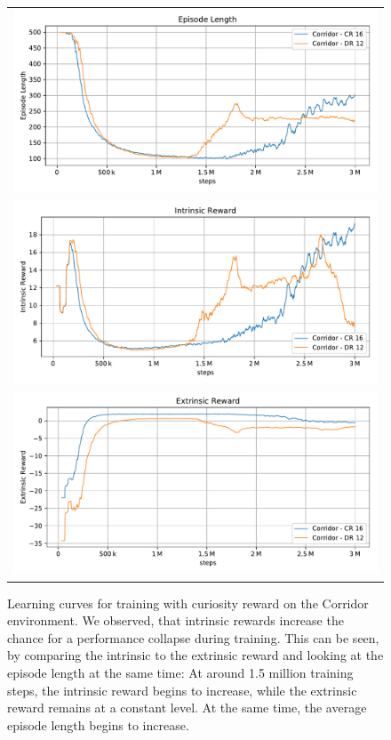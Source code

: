 \begin{figure}[htp]
    
    \begin{center}
        \begin{tabular}{c}
            \includegraphics[clip, width=0.75\columnwidth]{figures/evaluation/rewards/curiosity_divergence_ep_len.pdf} \\
            \includegraphics[clip, width=0.75\columnwidth]{figures/evaluation/rewards/curiosity_divergence_int_rew.pdf} \\
            \includegraphics[clip, width=0.75\columnwidth]{figures/evaluation/rewards/curiosity_divergence_ext_rew.pdf}
        \end{tabular}

    \end{center}
    
    \caption[Problems with Curiosity Reward]{Learning curves for training with curiosity reward on the Corridor environment. We observed, that intrinsic rewards increase the chance for a performance collapse during training. This can be seen, by comparing the intrinsic to the extrinsic reward and looking at the episode length at the same time: At around 1.5 million training steps, the intrinsic reward begins to increase, while the extrinsic reward remains at a constant level. At the same time, the average episode length begins to increase.}
    \label{fig:CuriosityDiverge}
\end{figure}



